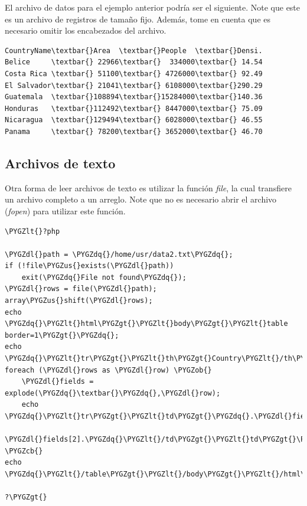 \documentclass[a5paper,10pt,spanish]{sphinxmanual}
\def\PYGZus{\char`\_}
\def\PYGZob{\char`\{}
\def\PYGZcb{\char`\}}
\def\PYGZlt{\char`\<}
\def\PYGZgt{\char`\>}
\def\PYGZdl{\char`\$}
\def\PYGZdq{\char`\"}
\begin{document}
El archivo de datos para el ejemplo anterior podría ser el siguiente.
Note que este es un archivo de registros de tamaño fijo. Además, tome en
cuenta que es necesario omitir los encabezados del archivo.

\begin{Verbatim}[commandchars=\\\{\}]
CountryName\textbar{}Area  \textbar{}People  \textbar{}Densi.
Belice     \textbar{} 22966\textbar{}  334000\textbar{} 14.54
Costa Rica \textbar{} 51100\textbar{} 4726000\textbar{} 92.49
El Salvador\textbar{} 21041\textbar{} 6108000\textbar{}290.29
Guatemala  \textbar{}108894\textbar{}15284000\textbar{}140.36
Honduras   \textbar{}112492\textbar{} 8447000\textbar{} 75.09
Nicaragua  \textbar{}129494\textbar{} 6028000\textbar{} 46.55
Panama     \textbar{} 78200\textbar{} 3652000\textbar{} 46.70
\end{Verbatim}


\subsection{Archivos de texto}
\label{Tutorial4_Archivos.md:archivos-de-texto}
Otra forma de leer archivos de texto es utilizar la función \emph{file}, la
cual transfiere un archivo completo a un arreglo. Note que no es
necesario abrir el archivo (\emph{fopen}) para utilizar este función.

\begin{Verbatim}[commandchars=\\\{\}]
\PYGZlt{}?php

\PYGZdl{}path = \PYGZdq{}/home/usr/data2.txt\PYGZdq{};
if (!file\PYGZus{}exists(\PYGZdl{}path))
    exit(\PYGZdq{}File not found\PYGZdq{});
\PYGZdl{}rows = file(\PYGZdl{}path);
array\PYGZus{}shift(\PYGZdl{}rows);
echo \PYGZdq{}\PYGZlt{}html\PYGZgt{}\PYGZlt{}body\PYGZgt{}\PYGZlt{}table border=1\PYGZgt{}\PYGZdq{};
echo \PYGZdq{}\PYGZlt{}tr\PYGZgt{}\PYGZlt{}th\PYGZgt{}Country\PYGZlt{}/th\PYGZgt{}\PYGZlt{}th\PYGZgt{}Area\PYGZlt{}/th\PYGZgt{}\PYGZlt{}th\PYGZgt{}Population\PYGZlt{}/th\PYGZgt{}\PYGZlt{}th\PYGZgt{}Density\PYGZlt{}/th\PYGZgt{}\PYGZlt{}/tr\PYGZgt{}\PYGZdq{};
foreach (\PYGZdl{}rows as \PYGZdl{}row) \PYGZob{}
    \PYGZdl{}fields = explode(\PYGZdq{}\textbar{}\PYGZdq{},\PYGZdl{}row);
    echo \PYGZdq{}\PYGZlt{}tr\PYGZgt{}\PYGZlt{}td\PYGZgt{}\PYGZdq{}.\PYGZdl{}fields[0].\PYGZdq{}\PYGZlt{}/td\PYGZgt{}\PYGZlt{}td\PYGZgt{}\PYGZdq{}.\PYGZdl{}fields[1].\PYGZdq{}\PYGZlt{}/td\PYGZgt{}\PYGZlt{}td\PYGZgt{}\PYGZdq{}.
         \PYGZdl{}fields[2].\PYGZdq{}\PYGZlt{}/td\PYGZgt{}\PYGZlt{}td\PYGZgt{}\PYGZdq{}.\PYGZdl{}fields[3].\PYGZdq{}\PYGZlt{}/td\PYGZgt{}\PYGZlt{}/tr\PYGZgt{}\PYGZdq{};
\PYGZcb{}
echo \PYGZdq{}\PYGZlt{}/table\PYGZgt{}\PYGZlt{}/body\PYGZgt{}\PYGZlt{}/html\PYGZgt{}\PYGZdq{};

?\PYGZgt{}
\end{Verbatim}
\end{document}
